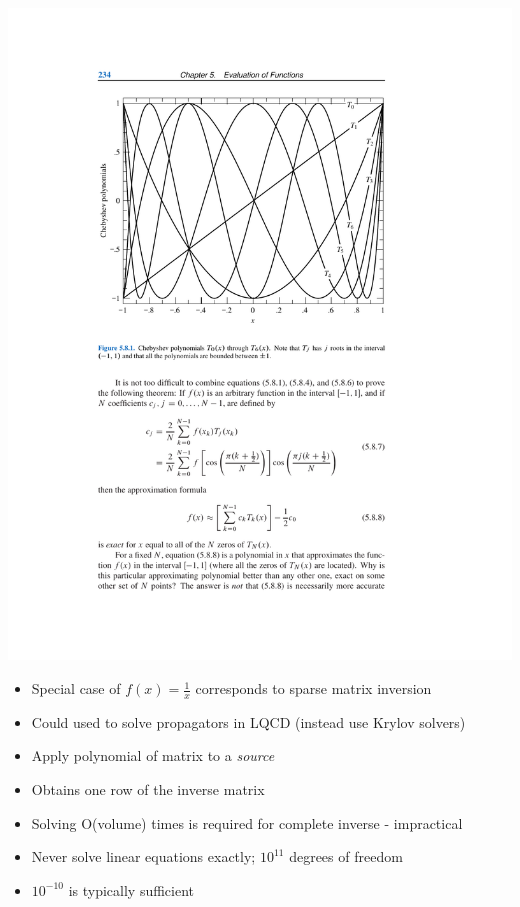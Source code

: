 \documentclass[pdf,ps,8pt]{beamer}
\begin{document}
\begin{frame}[fragile]
\begin{columns}
\begin{column}{0.5\textwidth}
        \includegraphics[width=\textwidth]{ChebyOrthog.pdf}
        \begin{itemize}
          \item Special case of $f(x) = \frac{1}{x}$ corresponds to sparse matrix inversion
          \item Could used to solve propagators in LQCD (instead use Krylov solvers)
          \item Apply polynomial of matrix to a \emph{source}
          \item Obtains one row of the inverse matrix
          \item Solving O(volume) times is required for complete inverse - impractical
          \item Never solve linear equations exactly; $10^{11}$ degrees of freedom
          \item $10^{-10}$ is typically sufficient
          \end{itemize}
      \end{column}
      \end{columns}
  \end{frame}
  
\end{document}
